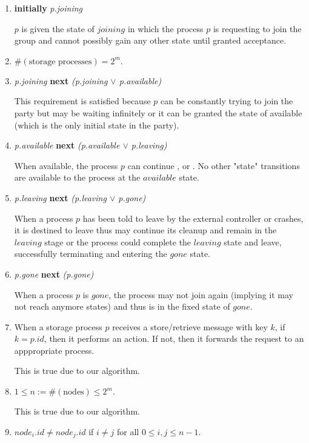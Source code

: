 \documentclass[11pt]{article}
\begin{document}
\begin{enumerate}[S1]
\item {\bfseries initially} {\it p.joining}

$p$ is given the state of $joining$ in which the process $p$ is requesting to join the group and cannot possibly gain any other state until granted acceptance.


\item $\#(\text{storage processes}) = 2^m.$

\item {\it p.joining} {\bfseries next} {\it (p.joining $\vee$ p.available)}

This requirement is satisfied because $p$ can be constantly trying to join the party but may be waiting infinitely or it can be granted the state of available (which is the only initial state in the party).

\item {\it p.available} {\bfseries next} {\it (p.available $\vee$ p.leaving)}

When available, the process $p$ can continue \available, or \leaving. No other "state" transitions are available to the process at the $available$ state. 

\item {\it p.leaving} {\bfseries next} {\it (p.leaving $\vee$ p.gone)}

When a process $p$ has been told to leave by the external controller or crashes, it is destined to leave thus may continue its cleanup and remain in the $leaving$ stage or the process could complete the $leaving$ state and leave, successfully terminating and entering the $gone$ state.

\item {\it p.gone} {\bfseries next} {\it (p.gone)}

When a process $p$ is $gone$, the process may not join again (implying it may not reach anymore states) and thus is in the fixed state of $gone$.



\item When a storage process $p$ receives a store/retrieve message with key $k$, if $k = p.id$, then it performs an action. If not, then it forwards the request to an apppropriate process.

This is true due to our algorithm.
\item $1 \leq n:= \#(\text{nodes}) \leq 2^m.$

This is true due to our algorithm.
\item $node_i.id \neq node_j.id$ if $i\neq j$ for all $0\leq i,j \leq n - 1.$ 


\end{enumerate}
\end{document}

